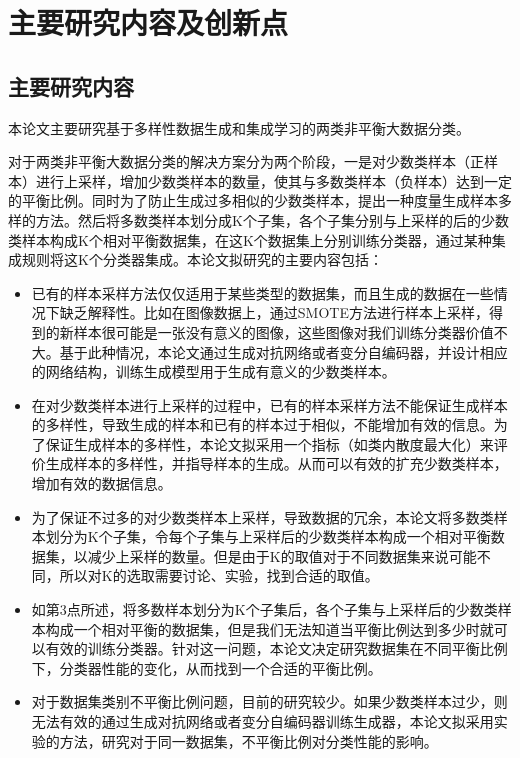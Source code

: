 \documentclass{article}
\begin{document}
\section{主要研究内容及创新点}
\subsection{主要研究内容}
本论文主要研究基于多样性数据生成和集成学习的两类非平衡大数据分类。
\par
对于两类非平衡大数据分类的解决方案分为两个阶段，一是对少数类样本（正样本）进行上采样，增加少数类样本的数量，使其与多数类样本（负样本）达到一定的平衡比例。同时为了防止生成过多相似的少数类样本，提出一种度量生成样本多样的方法。然后将多数类样本划分成K个子集，各个子集分别与上采样的后的少数类样本构成K个相对平衡数据集，在这K个数据集上分别训练分类器，通过某种集成规则将这K个分类器集成。本论文拟研究的主要内容包括：
\par
\begin{itemize}
    \item 
    已有的样本采样方法仅仅适用于某些类型的数据集，而且生成的数据在一些情况下缺乏解释性。比如在图像数据上，通过SMOTE方法进行样本上采样，得到的新样本很可能是一张没有意义的图像，这些图像对我们训练分类器价值不大。基于此种情况，本论文通过生成对抗网络或者变分自编码器，并设计相应的网络结构，训练生成模型用于生成有意义的少数类样本。
    \item 
    在对少数类样本进行上采样的过程中，已有的样本采样方法不能保证生成样本的多样性，导致生成的样本和已有的样本过于相似，不能增加有效的信息。为了保证生成样本的多样性，本论文拟采用一个指标（如类内散度最大化）来评价生成样本的多样性，并指导样本的生成。从而可以有效的扩充少数类样本，增加有效的数据信息。
    \item 
    为了保证不过多的对少数类样本上采样，导致数据的冗余，本论文将多数类样本划分为K个子集，令每个子集与上采样后的少数类样本构成一个相对平衡数据集，以减少上采样的数量。但是由于K的取值对于不同数据集来说可能不同，所以对K的选取需要讨论、实验，找到合适的取值。
    \item 
    如第3点所述，将多数样本划分为K个子集后，各个子集与上采样后的少数类样本构成一个相对平衡的数据集，但是我们无法知道当平衡比例达到多少时就可以有效的训练分类器。针对这一问题，本论文决定研究数据集在不同平衡比例下，分类器性能的变化，从而找到一个合适的平衡比例。
    \item 
    对于数据集类别不平衡比例问题，目前的研究较少。如果少数类样本过少，则无法有效的通过生成对抗网络或者变分自编码器训练生成器，本论文拟采用实验的方法，研究对于同一数据集，不平衡比例对分类性能的影响。
\end{itemize}
\end{document}
